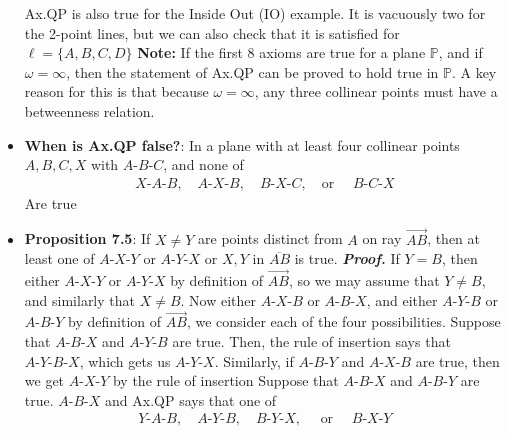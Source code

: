 \documentclass{report}
\begin{document}
\begin{itemize}
            \bigbreak \noindent 
            Ax.QP is also true for the Inside Out (IO) example. It is vacuously two for the 2-point lines, but we can also check that it is satisfied for $\ell = \{A,B,C,D\} $
            \bigbreak \noindent 
            \textbf{Note:} If the first 8 axioms are true for a plane $\mathbb{P}$, and if $\omega = \infty$, then the statement of Ax.QP can be proved to hold true in $\mathbb{P}$. A key reason for this is that because $\omega = \infty$, any three collinear points must have a betweenness relation.
        \item \textbf{When is Ax.QP false?}: In a plane with at least four collinear points $A,B,C,X$ with $ A\text{-}B\text{-}C$, and none of 
            \bigbreak \noindent 
            \begin{align*}
                    X\text{-}A\text{-}B, \quad A\text{-}X\text{-}B, \quad B\text{-}X\text{-}C, \quad \text{or } \quad B\text{-}C\text{-}X
            \end{align*}
            Are true
        \item \textbf{Proposition 7.5}: If $X \ne Y$ are points distinct from $A$ on ray $\overrightarrow{AB}$, then at least one of $ A\text{-}X\text{-}Y$ or $ A\text{-}Y\text{-}X$ or $X,Y$ in $ \overline{AB}$ is true.
            \bigbreak \noindent 
            \textbf{\textit{Proof.}} If $Y = B$, then either $ A\text{-}X\text{-}Y$ or $ A\text{-}Y\text{-}X$ by definition of $ \overrightarrow{AB}$, so we may assume that $Y \ne B$, and similarly that $X \ne B$.
            \bigbreak \noindent 
            Now either $ A\text{-}X\text{-}B$ or $ A\text{-}B\text{-}X$, and either $ A\text{-}Y\text{-}B$ or $ A\text{-}B\text{-}Y$ by definition of $ \overrightarrow{AB}$, we consider each of the four possibilities. 
            \bigbreak \noindent 
            Suppose that $ A\text{-}B\text{-}X$ and $ A\text{-}Y\text{-}B$ are true. Then, the rule of insertion says that $ A\text{-}Y\text{-}B\text{-}X$, which gets us $ A\text{-}Y\text{-}X$. Similarly, if $ A\text{-}B\text{-}Y$ and $ A\text{-}X\text{-}B$ are true, then we get $ A\text{-}X\text{-}Y$ by the rule of insertion
            \bigbreak \noindent 
            Suppose that $ A\text{-}B\text{-}X$ and $ A\text{-}B\text{-}Y$ are true. $ A\text{-}B\text{-}X $ and Ax.QP says that one of 
            \begin{align*}
                Y\text{-}A\text{-}B, \quad A\text{-}Y\text{-}B, \quad B\text{-}Y\text{-}X, \quad \text{ or } \quad B\text{-}X\text{-}Y 
            \end{align*}

\end{itemize}
\end{document}
